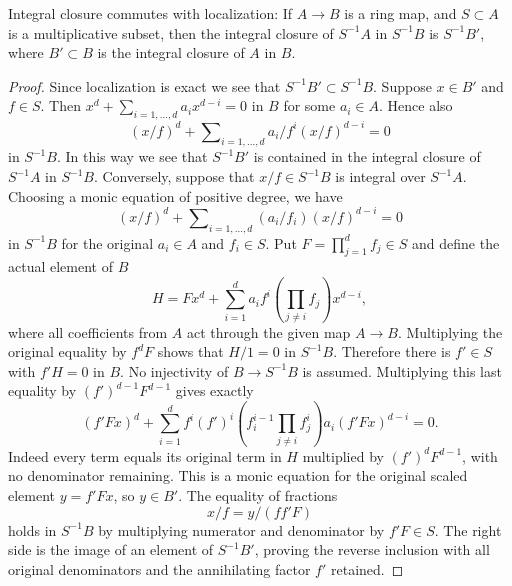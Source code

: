 \begin{lemma}
\label{lemma-integral-closure-localize}
Integral closure commutes with localization: If $A \to B$ is a ring
map, and $S \subset A$ is a multiplicative subset, then the integral
closure of $S^{-1}A$ in $S^{-1}B$ is $S^{-1}B'$, where $B' \subset B$
is the integral closure of $A$ in $B$.
\end{lemma}

\begin{proof}
Since localization is exact we see that $S^{-1}B' \subset S^{-1}B$.
Suppose $x \in B'$ and $f \in S$. Then
$x^d + \sum_{i = 1, \ldots, d} a_i x^{d - i} = 0$
in $B$ for some $a_i \in A$. Hence also
$$
(x/f)^d + \sum\nolimits_{i = 1, \ldots, d} a_i/f^i (x/f)^{d - i} = 0
$$
in $S^{-1}B$. In this way we see that $S^{-1}B'$ is contained in
the integral closure of $S^{-1}A$ in $S^{-1}B$. Conversely, suppose
that $x/f \in S^{-1}B$ is integral over $S^{-1}A$. Choosing a monic equation of positive degree, we have
$$
(x/f)^d + \sum\nolimits_{i = 1, \ldots, d} (a_i/f_i) (x/f)^{d - i} = 0
$$
in $S^{-1}B$ for the original $a_i\in A$ and $f_i\in S$.
Put $F=\prod_{j=1}^d f_j\in S$ and define the actual element of $B$
$$
H=Fx^d+\sum_{i=1}^d a_i f^i
\left(\prod_{j\ne i}f_j\right)x^{d-i},
$$
where all coefficients from $A$ act through the given map $A\to B$.
Multiplying the original equality by $f^dF$ shows that $H/1=0$
in $S^{-1}B$. Therefore there is $f'\in S$ with $f'H=0$ in $B$.
No injectivity of $B\to S^{-1}B$ is assumed. Multiplying this
last equality by $(f')^{d-1}F^{d-1}$ gives exactly
$$
(f'Fx)^d+
\sum_{i=1}^d f^i(f')^i
\left(f_i^{i-1}\prod_{j\ne i}f_j^i\right)a_i
(f'Fx)^{d-i}=0.
$$
Indeed every term equals its original term in $H$ multiplied by
$(f')^dF^{d-1}$, with no denominator remaining. This is a monic
equation for the original scaled element $y=f'Fx$, so $y\in B'$.
The equality of fractions
$$
x/f=y/(ff'F)
$$
holds in $S^{-1}B$ by multiplying numerator and denominator by
$f'F\in S$. The right side is the image of an element of
$S^{-1}B'$, proving the reverse inclusion with all original
denominators and the annihilating factor $f'$ retained.
\end{proof}
